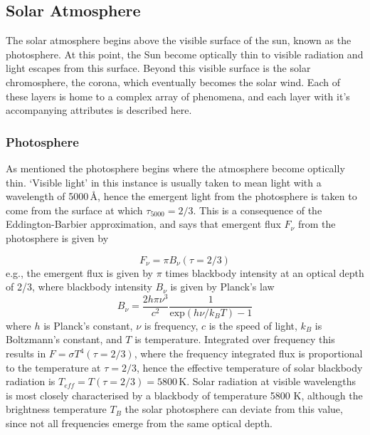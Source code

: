 \subsection{Solar Atmosphere}\label{sec:12}

The solar atmosphere begins above the visible surface of the sun, known as the photosphere. At this point, the Sun become optically thin to visible radiation and light escapes from this surface. Beyond this visible surface is the solar chromosphere, the corona, which eventually becomes the solar wind. Each of these layers is home to a complex array of phenomena, and each layer with it's accompanying attributes is described here.


\subsubsection{Photosphere}\label{sec:121}

As mentioned the photosphere begins where the atmosphere become optically thin. \textquoteleft Visible light' in this instance is usually taken to mean light with a wavelength of 5000\,\AA, hence the emergent light from the photosphere is taken to come from the surface at which $\tau_{5000}=2/3$. This is a consequence of the Eddington-Barbier approximation, and says that emergent flux $F_{\nu}$ from the photosphere is given by

\begin{equation}
F_\nu = \pi B_\nu(\tau=2/3)
\end{equation}
e.g., the emergent flux is given by $\pi$ times blackbody intensity at an optical depth of 2/3, where blackbody intensity $B_\nu$ is given by Planck's law 
\begin{equation}
B_\nu = \frac{2h\pi\nu^3}{c^2}\frac{1}{\mathrm{exp}(h\nu/k_BT)-1}
\end{equation}
where $h$ is Planck's constant, $\nu$ is frequency, $c$ is the speed of light, $k_B$ is Boltzmann's constant, and $T$ is temperature. Integrated over frequency this results in $F = \sigma T^4(\tau=2/3)$, where the frequency integrated flux is proportional to the temperature at $\tau=2/3$, hence the effective temperature of solar blackbody radiation is $T_{eff}=T(\tau=2/3)=5800$\,K. Solar radiation at visible wavelengths is most closely characterised by a blackbody of temperature 5800 K, although the brightness temperature $T_B$ the solar photosphere can deviate from this value, since not all frequencies emerge from the same optical depth.


